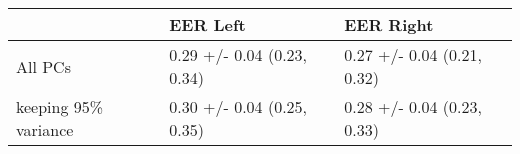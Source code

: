 \begin{tabular}{lll}
\toprule
{} &                    EER Left &                   EER Right \\
\midrule
All PCs              &  0.29 +/- 0.04 (0.23, 0.34) &  0.27 +/- 0.04 (0.21, 0.32) \\
keeping 95\% variance &  0.30 +/- 0.04 (0.25, 0.35) &  0.28 +/- 0.04 (0.23, 0.33) \\
\bottomrule
\end{tabular}
